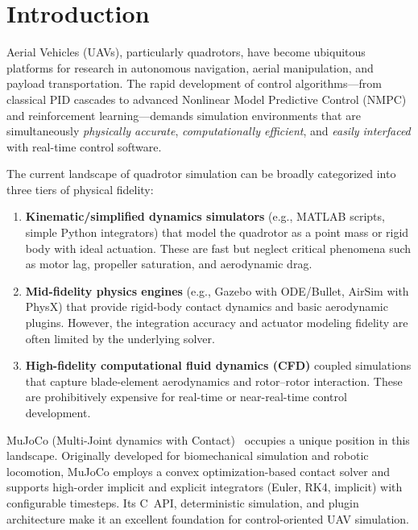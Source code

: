 \documentclass[journal]{IEEEtran}
\begin{document}
\section{Introduction}
\label{sec:introduction}

 Aerial Vehicles (UAVs), particularly quadrotors, have become ubiquitous platforms for research in autonomous navigation, aerial manipulation, and payload transportation. The rapid development of control algorithms---from classical PID cascades to advanced Nonlinear Model Predictive Control (NMPC) and reinforcement learning---demands simulation environments that are simultaneously \emph{physically accurate}, \emph{computationally efficient}, and \emph{easily interfaced} with real-time control software.

The current landscape of quadrotor simulation can be broadly categorized into three tiers of physical fidelity:

\begin{enumerate}
  \item \textbf{Kinematic/simplified dynamics simulators} (e.g., MATLAB scripts, simple Python integrators) that model the quadrotor as a point mass or rigid body with ideal actuation. These are fast but neglect critical phenomena such as motor lag, propeller saturation, and aerodynamic drag.

  \item \textbf{Mid-fidelity physics engines} (e.g., Gazebo with ODE/Bullet, AirSim with PhysX) that provide rigid-body contact dynamics and basic aerodynamic plugins. However, the integration accuracy and actuator modeling fidelity are often limited by the underlying solver.

  \item \textbf{High-fidelity computational fluid dynamics (CFD)} coupled simulations that capture blade-element aerodynamics and rotor--rotor interaction. These are prohibitively expensive for real-time or near-real-time control development.
\end{enumerate}

MuJoCo (Multi-Joint dynamics with Contact)~\cite{todorov2012mujoco} occupies a unique position in this landscape. Originally developed for biomechanical simulation and robotic locomotion, MuJoCo employs a convex optimization-based contact solver and supports high-order implicit and explicit integrators (Euler, RK4, implicit) with configurable timesteps. Its C~API, deterministic simulation, and plugin architecture make it an excellent foundation for control-oriented UAV simulation.
\end{document}

